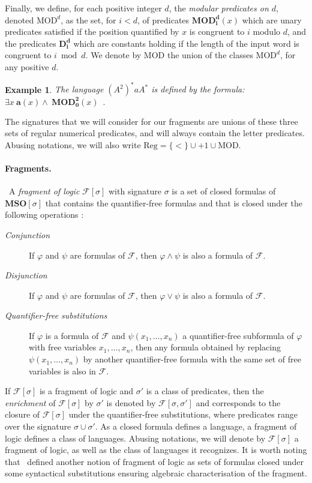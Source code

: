 \documentclass[submission,hidelink]{dmtcs-episciences}
\newtheorem{example}{Example}
\newcommand{\cF}{\mathcal{F}}
\newcommand{\MSO}{\mathbf{MSO}}
\newcommand{\Reg}{\mathrm{Reg}}
\newcommand{\MOD}{\mathrm{MOD}}
\begin{document}
	Finally, we define, for each positive integer $d$, the \emph{modular predicates on $d$}, denoted $\MOD^d$, as the set, for $i<d$, of predicates
$\mathbf{MOD_i^d}(x)$ which are unary predicates satisfied if the position quantified by $x$ is congruent to $i$ modulo $d$, and the predicates
	$\mathbf{D_i^d}$ which are constants holding if the length of the input word is congruent to $i\bmod d$.
	We denote by $\MOD$ the union of the classes $\MOD^d$, for any positive $d$.
	\begin{example}
		The language $(A^2)^*aA^*$ is defined by the formula:
		$\exists x \ \mathbf a(x) \land\ \mathbf{MOD_0^2}(x)\enspace.$
	\end{example}

The signatures that we will consider for our fragments are unions of these three sets of regular numerical predicates, and will always contain the letter predicates.
Abusing notations, we will also write $\Reg=\{<\}\cup +1 \cup\MOD$.


\paragraph{Fragments.}
\
A \emph{fragment of logic} $\cF[\sigma]$ with signature $\sigma$ is a set of closed formulas of $\MSO[\sigma]$
	that contains the quantifier-free formulas and that is
	closed
	under the following operations :
	\begin{description}
	\item[\textit{Conjunction}] If $\varphi$ and $\psi$ are formulas of $\cF$,
				then $\varphi\wedge \psi$ is also a formula of $\cF$.
	\item[\textit{Disjunction}] If $\varphi$ and $\psi$ are formulas of $\cF$,
				then $\varphi\vee \psi$ is also a formula of $\cF$.
\item[\textit{Quantifier-free substitutions}] If $\varphi$ is a formula of $\cF$ and $\psi(x_1,\ldots,x_n)$ a quantifier-free subformula of $\varphi$ with free variables $x_1,\ldots,x_n$, then any formula obtained by replacing $\psi(x_1,\ldots,x_n)$ by another quantifier-free formula with the same set of free variables is also in $\cF$.
	\end{description}

	If $\cF[\sigma]$ is a fragment of logic and $\sigma'$ is a class of predicates, then the \emph{enrichment} of $\cF[\sigma]$ by $\sigma'$ is denoted by $\cF[\sigma,\sigma']$ and corresponds to the closure of $\cF[\sigma]$ under the quantifier-free substitutions, where predicates range over the signature $\sigma\cup \sigma'$.
As a closed formula defines a language, a fragment of logic defines a class of languages. Abusing notations, we will denote by $\cF[\sigma]$ a
	fragment of logic, as well as the class of languages it recognizes.
	It is worth noting that~\cite{KL12} defined another notion of fragment of logic as sets of
	formulas closed under some syntactical substitutions ensuring algebraic characterisation of the fragment.
\end{document}

